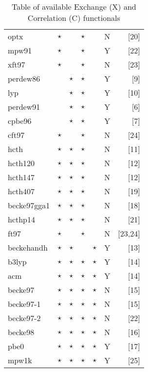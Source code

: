 \begin{table}[htp]
\begin{tabular}{|l|ccccc|r|}
optx       & $\star$    &             &  $\star$  &        &  N   &[20]\\
mpw91      & $\star$    &             &  $\star$  &        &  Y   &[22]\\
xft97      & $\star$    &             &  $\star$  &        &  N   &[23]\\
\hline                                                  
perdew86   &          &   $\star$     &  $\star$  &        &  Y   &[9]\\
lyp        &          &   $\star$     &  $\star$  &        &  Y   &[10]\\
perdew91   &          &   $\star$     &  $\star$  &        &  Y   &[6]\\
cpbe96     &          &   $\star$     &  $\star$  &        &  Y   &[7]\\
cft97      & $\star$    &             &  $\star$  &        &  N   &[24]\\
\hline                                                  
hcth       & $\star$    &   $\star$     &  $\star$  &        &  N   &[11]\\
hcth120    & $\star$    &   $\star$     &  $\star$  &        &  N   &[12]\\
hcth147    & $\star$    &   $\star$     &  $\star$  &        &  N   &[12]\\
hcth407    & $\star$    &   $\star$     &  $\star$  &        &  N   &[19]\\
becke97gga1  & $\star$    &   $\star$     &  $\star$  &        &  N   &[18]\\
hcthp14    & $\star$    &   $\star$     &  $\star$  &        &  N   &[21]\\
ft97      & $\star$    &             &  $\star$  &        &  N   &[23,24]\\
\hline                                                  
beckehandh & $\star$    &   $\star$     &           & $\star$  &  Y   &[13]\\
b3lyp      & $\star$    &   $\star$     &  $\star$  & $\star$  &  Y   &[14]\\
acm        & $\star$    &   $\star$     &  $\star$  & $\star$  &  Y   &[14]\\
becke97    & $\star$    &   $\star$     &  $\star$  & $\star$  &  N   &[15]\\
becke97-1  & $\star$    &   $\star$     &  $\star$  & $\star$  &  N   &[15]\\
becke97-2  & $\star$    &   $\star$     &  $\star$  & $\star$  &  N   &[22]\\
becke98    & $\star$    &   $\star$     &  $\star$  & $\star$  &  N   &[16]\\
pbe0       & $\star$    &   $\star$     &  $\star$  & $\star$  &  Y   &[17]\\
mpw1k       & $\star$    &   $\star$     &  $\star$  & $\star$  &  Y   &[25]\\
\hline
\end{tabular}
\caption{Table of available Exchange (X) and Correlation (C) functionals}
\label{tablexc}
\end{table}
